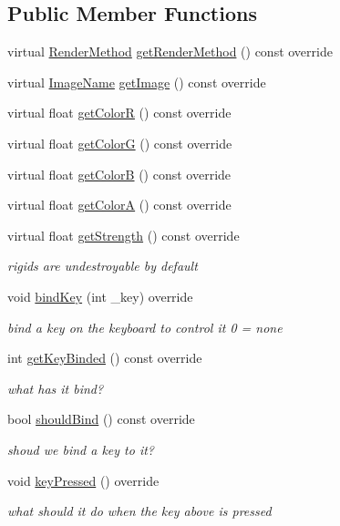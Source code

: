 \subsection*{Public Member Functions}
\begin{DoxyCompactItemize}
\item 
virtual \hyperlink{classMatter_ade1ce1bf81f25377f689d103cd431907}{Render\+Method} \hyperlink{classEngine_a72c7a3ea05ac92bdb909e11b20d8d6fc}{get\+Render\+Method} () const override
\item 
virtual \hyperlink{image_8h_af9361b398b5cfcafbe93f82e8eaeb080}{Image\+Name} \hyperlink{classEngine_a130b5e67a05c2ea6f9c2f5d7a4fc60dd}{get\+Image} () const override
\item 
virtual float \hyperlink{classEngine_a9ad7ea816b850dc812b6a792493a803e}{get\+Color\+R} () const override
\item 
virtual float \hyperlink{classEngine_abd2e81839210c4c98b6cad705af25cec}{get\+Color\+G} () const override
\item 
virtual float \hyperlink{classEngine_aefc235452646da3c6b9b77c625ef3278}{get\+Color\+B} () const override
\item 
virtual float \hyperlink{classEngine_aefe56a242ce462d18958c2e217a0df7a}{get\+Color\+A} () const override
\item 
virtual float \hyperlink{classEngine_a1cf8f75f0ccc44aee67aea3174cee308}{get\+Strength} () const override
\begin{DoxyCompactList}\small\item\em rigids are undestroyable by default \end{DoxyCompactList}\item 
void \hyperlink{classEngine_adcebb4115667ea0924af3b5aeb5fd5e2}{bind\+Key} (int \+\_\+key) override
\begin{DoxyCompactList}\small\item\em bind a key on the keyboard to control it 0 = none \end{DoxyCompactList}\item 
int \hyperlink{classEngine_afedd663b3ada7e15028fd157be3f4517}{get\+Key\+Binded} () const override
\begin{DoxyCompactList}\small\item\em what has it bind? \end{DoxyCompactList}\item 
bool \hyperlink{classEngine_a5f949b7b1d1c621de8940470adbc3901}{should\+Bind} () const override
\begin{DoxyCompactList}\small\item\em shoud we bind a key to it? \end{DoxyCompactList}\item 
void \hyperlink{classEngine_a7ec1e7e83a96a39490bc13b6906250f3}{key\+Pressed} () override
\begin{DoxyCompactList}\small\item\em what should it do when the key above is pressed \end{DoxyCompactList}\end{DoxyCompactItemize}
